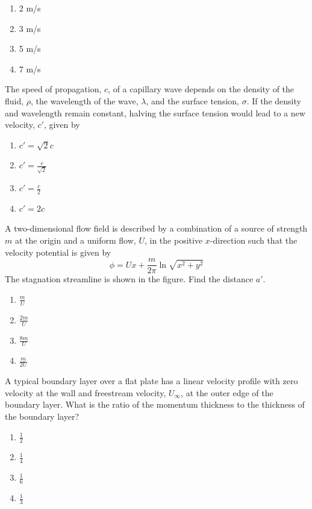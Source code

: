     \begin{enumerate}
        \item 2 m/s
        \item 3 m/s
        \item 5 m/s
        \item 7 m/s
    \end{enumerate}
\bigskip
    \item The speed of propagation, $c$, of a capillary wave depends on the density of the fluid, $\rho$, the wavelength of the wave, $\lambda$, and the surface tension, $\sigma$. If the density and wavelength remain constant, halving the surface tension would lead to a new velocity, $c'$, given by
    \begin{enumerate}
        \item $c' = \sqrt{2}c$
        \item $c' = \frac{c}{\sqrt{2}}$
        \item $c' = \frac{c}{2}$
        \item $c' = 2c$
    \end{enumerate}
    
    \item A two-dimensional flow field is described by a combination of a source of strength $m$ at the origin and a uniform flow, $U$, in the positive $x$-direction such that the velocity potential is given by
    \[
    \phi = Ux + \frac{m}{2\pi} \ln \sqrt{x^2 + y^2}
    \]
    The stagnation streamline is shown in the figure. Find the distance $a'$.
    \begin{enumerate}
        \item $\frac{m}{U}$
        \item $\frac{2m}{U}$
        \item $\frac{8m}{U}$
        \item $\frac{m}{2U}$
    \end{enumerate}

    \item A typical boundary layer over a flat plate has a linear velocity profile with zero velocity at the wall and freestream velocity, $U_\infty$, at the outer edge of the boundary layer. What is the ratio of the momentum thickness to the thickness of the boundary layer?
    \begin{enumerate}
        \item $\frac{1}{2}$
        \item $\frac{1}{4}$
        \item $\frac{1}{6}$
        \item $\frac{1}{3}$
    \end{enumerate}
    
